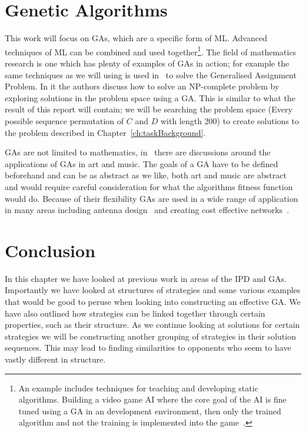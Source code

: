 \section{Genetic Algorithms}
This work will focus on GAs, which are a specific form of ML.
Advanced techniques of ML can be combined and used together\footnote{An example includes techniques for teaching and developing static algorithms. Building a video game AI where the core goal of the AI is fine tuned using a GA in an development environment, then only the trained algorithm and not the training is implemented into the game~\cite{bakkes2009rapid}.}.
The field of mathematics research is one which has plenty of examples of GAs in action;
for example the same techniques as we will using is used in~\cite{chu1997genetic} to solve the Generalised Assignment Problem.
In it the authors discuss how to solve an NP-complete problem by exploring solutions in the problem space using a GA.
This is similar to what the result of this report will contain;
we will be searching the problem space (Every possible sequence permutation of $C$ and $D$ with length 200) to create solutions to the problem described in Chapter~\ref{ch:taskBackground}.

GAs are not limited to mathematics, in~\cite{hauptpractical} there are discussions around the applications of GAs in art and music.
The goals of a GA have to be defined beforehand and can be as abstract as we like, both art and music are abstract and would require careful consideration for what the algorithms fitness function would do. 
Because of their flexibility GAs are used in a wide range of application in many areas including antenna design~\cite{lohn2004evolutionary} and creating cost effective networks~\cite{savic1997genetic}.

\section{Conclusion}
In this chapter we have looked at previous work in areas of the IPD and GAs.
Importantly we have looked at structures of strategies and some various examples that would be good to peruse when looking into constructing an effective GA.
We have also outlined how strategies can be linked together through certain properties, such as their structure.
As we continue looking at solutions for certain strategies we will be constructing another grouping of strategies in their solution sequences.
This may lead to finding similarities to opponents who seem to have vastly different in structure.
